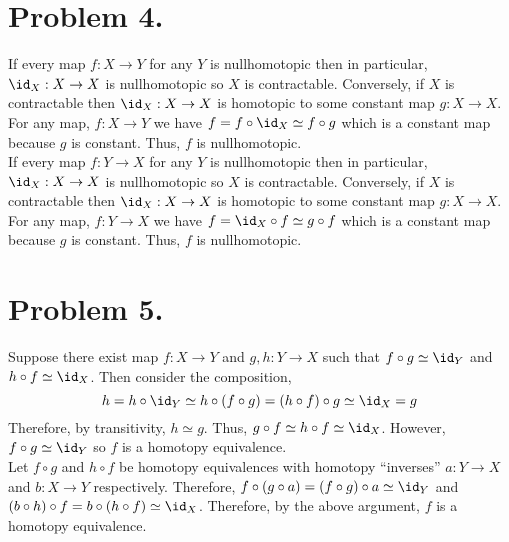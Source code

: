 \documentclass[12pt]{extarticle}
\begin{document}
\section*{Problem 4.}

If every map $f : X \to Y$ for any $Y$ is nullhomotopic then in particular, $\id_X : X \to X$ is nullhomotopic so $X$ is contractable. Conversely, if $X$ is contractable then $\id_X : X \to X$ is homotopic to some constant map $g : X \to X$. For any map, $f : X \to Y$ we have $f = f \circ \id_X \simeq f \circ g$ which is a constant map because $g$ is constant. Thus, $f$ is nullhomotopic.  \bigskip \\

If every map $f : Y \to X$ for any $Y$ is nullhomotopic then in particular, $\id_X : X \to X$ is nullhomotopic so $X$ is contractable. Conversely, if $X$ is contractable then $\id_X : X \to X$ is homotopic to some constant map $g : X \to X$. For any map, $f : Y \to X$ we have $f = \id_X \circ f \simeq g \circ f$ which is a constant map because $g$ is constant. Thus, $f$ is nullhomotopic. \bigskip \\

\section*{Problem 5.}

Suppose there exist map $f : X \to Y$ and $g,h : Y \to X$ such that $f \circ g \simeq \id_Y$ and $h \circ f \simeq \id_X$. Then consider the composition,
\[h = h \circ \id_Y \simeq h \circ (f \circ g) = (h \circ f) \circ g \simeq \id_X = g\]
Therefore, by transitivity, $h \simeq g$. Thus, $g \circ f \simeq h \circ f \simeq \id_X$. However, $f \circ g \simeq \id_Y$ so $f$ is a homotopy equivalence. \bigskip \\
Let $f \circ g$ and $h \circ f$ be homotopy equivalences with homotopy ``inverses'' $a : Y \to X$ and $b : X \to Y$ respectively. Therefore, $f \circ (g \circ a) = (f \circ g) \circ a \simeq \id_Y$ and $(b \circ h) \circ f = b \circ (h \circ f) \simeq \id_X$. Therefore, by the above argument, $f$ is a homotopy equivalence.
 
\end{document}
